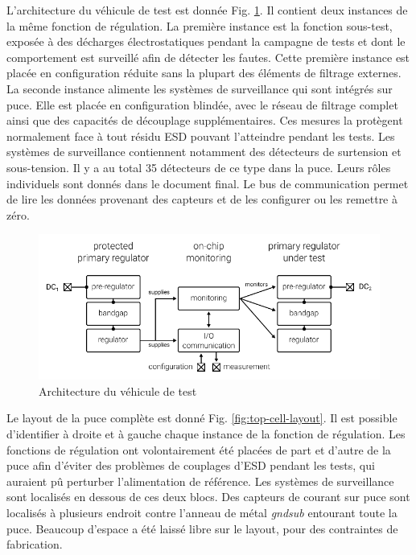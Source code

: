 L'architecture du véhicule de test est donnée Fig. \ref{architecture_testchip}.
Il contient deux instances de la même fonction de régulation.
La première instance est la fonction sous-test, exposée à des décharges électrostatiques pendant la campagne de tests et dont le comportement est surveillé afin de détecter les fautes.
Cette première instance est placée en configuration réduite sans la plupart des éléments de filtrage externes.
La seconde instance alimente les systèmes de surveillance qui sont intégrés sur puce.
Elle est placée en configuration blindée, avec le réseau de filtrage complet ainsi que des capacités de découplage supplémentaires.
Ces mesures la protègent normalement face à tout résidu ESD pouvant l'atteindre pendant les tests.
Les systèmes de surveillance contiennent notamment des détecteurs de surtension et sous-tension.
Il y a au total 35 détecteurs de ce type dans la puce.
Leurs rôles individuels sont donnés dans le document final.
Le bus de communication permet de lire les données provenant des capteurs et de les configurer ou les remettre à zéro.

\begin{figure}[h]
  \centering
  \includegraphics{src/1/figures/architecture_testchip.pdf}
  \caption{Architecture du véhicule de test}
  \label{architecture_testchip}
\end{figure}

Le layout de la puce complète est donné Fig. \ref{fig:top-cell-layout}.
Il est possible d'identifier à droite et à gauche chaque instance de la fonction de régulation.
Les fonctions de régulation ont volontairement été placées de part et d'autre de la puce afin d'éviter des problèmes de couplages d'ESD pendant les tests, qui auraient pû perturber l'alimentation de référence.
Les systèmes de surveillance sont localisés en dessous de ces deux blocs.
Des capteurs de courant sur puce sont localisés à plusieurs endroit contre l'anneau de métal \textit{gndsub} entourant toute la puce.
Beaucoup d'espace a été laissé libre sur le layout, pour des contraintes de fabrication.

